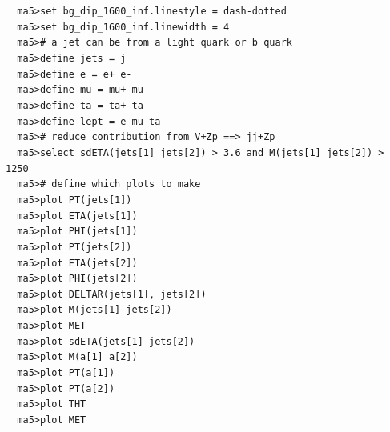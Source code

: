 \documentclass[a4paper, 10pt]{article}
\begin{document}
\texttt{ }\texttt{ }\texttt{ma5>set bg\_dip\_1600\_inf.linestyle = dash-dotted\\
}
\texttt{ }\texttt{ }\texttt{ma5>set bg\_dip\_1600\_inf.linewidth = 4\\
}
\texttt{ }\texttt{ }\texttt{ma5>\# a jet can be from a light quark or b quark\\
}
\texttt{ }\texttt{ }\texttt{ma5>define jets = j\\
}
\texttt{ }\texttt{ }\texttt{ma5>define e = e+ e-\\
}
\texttt{ }\texttt{ }\texttt{ma5>define mu = mu+ mu-\\
}
\texttt{ }\texttt{ }\texttt{ma5>define ta = ta+ ta-\\
}
\texttt{ }\texttt{ }\texttt{ma5>define lept = e mu ta\\
}
\texttt{ }\texttt{ }\texttt{ma5>\# reduce contribution from V+Zp ==> jj+Zp\\
}
\texttt{ }\texttt{ }\texttt{ma5>select sdETA(jets[1] jets[2]) > 3.6 and M(jets[1] jets[2]) > 1250\\
}
\texttt{ }\texttt{ }\texttt{ma5>\# define which plots to make\\
}
\texttt{ }\texttt{ }\texttt{ma5>plot PT(jets[1])\\
}
\texttt{ }\texttt{ }\texttt{ma5>plot ETA(jets[1])\\
}
\texttt{ }\texttt{ }\texttt{ma5>plot PHI(jets[1])\\
}
\texttt{ }\texttt{ }\texttt{ma5>plot PT(jets[2])\\
}
\texttt{ }\texttt{ }\texttt{ma5>plot ETA(jets[2])\\
}
\texttt{ }\texttt{ }\texttt{ma5>plot PHI(jets[2])\\
}
\texttt{ }\texttt{ }\texttt{ma5>plot DELTAR(jets[1], jets[2])\\
}
\texttt{ }\texttt{ }\texttt{ma5>plot M(jets[1] jets[2])\\
}
\texttt{ }\texttt{ }\texttt{ma5>plot MET\\
}
\texttt{ }\texttt{ }\texttt{ma5>plot sdETA(jets[1] jets[2])\\
}
\texttt{ }\texttt{ }\texttt{ma5>plot M(a[1] a[2])\\
}
\texttt{ }\texttt{ }\texttt{ma5>plot PT(a[1])\\
}
\texttt{ }\texttt{ }\texttt{ma5>plot PT(a[2])\\
}
\texttt{ }\texttt{ }\texttt{ma5>plot THT\\
}
\texttt{ }\texttt{ }\texttt{ma5>plot MET\\
}
\end{document}
